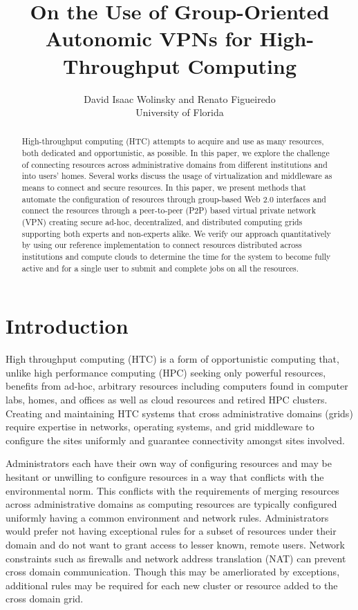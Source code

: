 \documentclass{sig-alternate}
\begin{document}
\title{On the Use of Group-Oriented Autonomic VPNs for High-Throughput Computing}

\author{
David Isaac Wolinsky and Renato Figueiredo
\\
University of Florida
\\
}

\maketitle

\begin{abstract}
High-throughput computing (HTC) attempts to acquire and use as many resources,
both dedicated and opportunistic, as possible.  In this paper, we explore the
challenge of connecting resources across administrative domains from different
institutions and into users' homes.  Several works discuss the usage of
virtualization and middleware as means to connect and secure resources.  In
this paper, we present methods that automate the configuration of resources
through group-based Web 2.0 interfaces and connect the resources through a
peer-to-peer (P2P) based virtual private network (VPN) creating secure ad-hoc,
decentralized, and distributed computing grids supporting both experts and
non-experts alike.  We verify our approach quantitatively by using our
reference implementation to connect resources distributed across institutions
and compute clouds to determine the time for the system to become fully active
and for a single user to submit and complete jobs on all the resources.
\end{abstract}

\section{Introduction}
High throughput computing (HTC) is a form of opportunistic computing that,
unlike high performance computing (HPC) seeking only powerful resources,
benefits from ad-hoc, arbitrary resources including computers found in computer
labs, homes, and offices as well as cloud resources and retired HPC clusters.
Creating and maintaining HTC systems that cross administrative domains (grids)
require expertise in networks, operating systems, and grid middleware to
configure the sites uniformly and guarantee connectivity amongst sites involved.

Administrators each have their own way of configuring resources and may be
hesitant or unwilling to configure resources in a way that conflicts with the
environmental norm.  This conflicts with the requirements of merging resources
across administrative domains as computing resources are typically configured
uniformly having a common environment and network rules.  Administrators would
prefer not having exceptional rules for a subset of resources under their
domain and do not want to grant access to lesser known, remote users.  Network
constraints such as firewalls and network address translation (NAT) can prevent
cross domain communication.  Though this may be amerliorated by exceptions,
additional rules may be required for each new cluster or resource added to the
cross domain grid.
\end{document}
